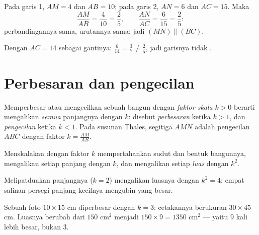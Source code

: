 \begin{example}\label{ex:g9:thales:converse}
Pada garis 1, $AM = 4$ dan $AB = 10$; pada garis 2, $AN = 6$ dan
$AC = 15$. Maka
\[
\frac{AM}{AB} = \frac{4}{10} = \frac25,
\qquad
\frac{AN}{AC} = \frac{6}{15} = \frac25 :
\]
perbandingannya sama, urutannya sama: jadi $(MN) \parallel (BC)$.

Dengan $AC = 14$ sebagai gantinya: $\frac{6}{14} = \frac37 \neq
\frac25$, jadi garisnya tidak .
\end{example}

\section{Perbesaran dan pengecilan}

\begin{definition}\label{def:g9:thales:scaling}
Memperbesar atau mengecilkan sebuah bangun dengan \emph{faktor
skala} $k > 0$ berarti mengalikan \emph{semua}
panjangnya dengan $k$: disebut \emph{perbesaran} ketika $k > 1$, dan
\emph{pengecilan} ketika $k < 1$. Pada susunan Thales, segitiga $AMN$
adalah pengecilan $ABC$ dengan faktor $k = \frac{AM}{AB}$.
\end{definition}

\begin{proposition}\label{prop:g9:thales:scaling}
Menskalakan dengan faktor $k$ mempertahankan sudut dan bentuk
bangunnya, mengalikan setiap panjang dengan $k$, dan mengalikan setiap
\emph{luas} dengan $k^2$.
\end{proposition}
\admitted

\begin{omfigure}

{\small Melipatduakan panjangnya ($k = 2$) mengalikan luasnya dengan
$k^2 = 4$: empat salinan persegi panjang kecilnya mengubin yang besar.}
\end{omfigure}

\begin{example}
Sebuah foto $10 \times 15$ cm diperbesar dengan  $k = 3$:
cetakannya berukuran $30 \times 45$ cm. Luasnya berubah dari $150$
cm$^2$ menjadi $150 \times 9 = 1350$ cm$^2$ --- yaitu $9$ kali lebih
besar, bukan $3$.
\end{example}

